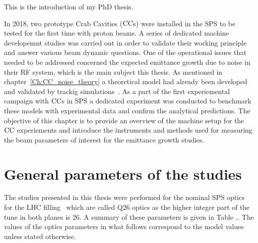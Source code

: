 This is the introduction of my PhD thesis.
\newpage

 In 2018, two prototype Crab Cavities (${\mathrm{CC}}$s) were installed in the SPS to be tested for the first time with proton beams. A series of dedicated machine developemnt studies was carried out in order to validate their working principle and answer various beam dynamic questions. One of the operational issues that needed to be addressed concerned the expected emittance growth due to noise in their RF system, which is the main subject this thesis.  As mentioned in chapter~\ref{Ch:CC_noise_theory} a theoretical model had already been developed and validated by trackig simulations~\cite{PhysRevSTAB.18.101001}. 
 As a part of the first experiemental campaign with ${\mathrm{CC}}$s in SPS a dedicated experiment was conducted to benchmark these models with experimental data and confirm the analytical predictions. The objective of this chapter is to provide an overview of the machine setup for the ${\mathrm{CC}}$ experiements and introduce the instruments and methods used for measuring the beam parameters of interest for the emittance growth studies.
 

 \section{General parameters of the studies}
 The studies presented in this thesis were performed for the nominal SPS optics for the LHC filling~\cite{SPS_optics_repo} which are called Q26 optics as the higher integer part of the tune in both planes is 26. A summary of these parameters is given in Table .. The values of the optics parameters in what follows correspond to the model values unless stated otherwise.





 
